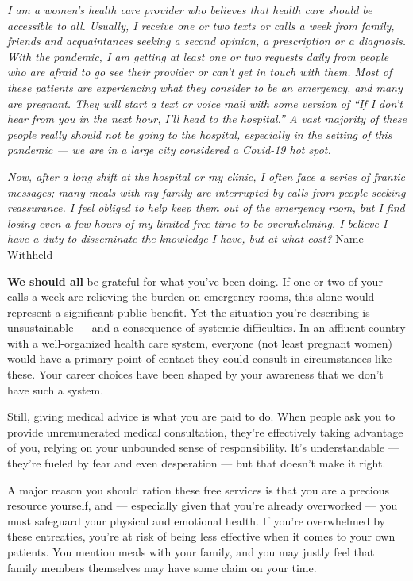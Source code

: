 \emph{I am a women's health care provider who believes that health care
should be accessible to all. Usually, I receive one or two texts or
calls a week from family, friends and acquaintances seeking a second
opinion, a prescription or a diagnosis. With the pandemic, I am getting
at least one or two requests daily from people who are afraid to go see
their provider or can't get in touch with them. Most of these patients
are experiencing what they consider to be an emergency, and many are
pregnant. They will start a text or voice mail with some version of ``If
I don't hear from you in the next hour, I'll head to the hospital.'' A
vast majority of these people really should not be going to the
hospital, especially in the setting of this pandemic --- we are in a
large city considered a Covid-19 hot spot.}

\emph{Now, after a long shift at the hospital or my clinic, I often face
a series of frantic messages; many meals with my family are interrupted
by calls from people seeking reassurance. I feel obliged to help keep
them out of the emergency room, but I find losing even a few hours of my
limited free time to be overwhelming. I believe I have a duty to
disseminate the knowledge I have, but at what cost?} Name Withheld

\textbf{We should all} be grateful for what you've been doing. If one or
two of your calls a week are relieving the burden on emergency rooms,
this alone would represent a significant public benefit. Yet the
situation you're describing is unsustainable --- and a consequence of
systemic difficulties. In an affluent country with a well-organized
health care system, everyone (not least pregnant women) would have a
primary point of contact they could consult in circumstances like these.
Your career choices have been shaped by your awareness that we don't
have such a system.

Still, giving medical advice is what you are paid to do. When people ask
you to provide unremunerated medical consultation, they're effectively
taking advantage of you, relying on your unbounded sense of
responsibility. It's understandable --- they're fueled by fear and even
desperation --- but that doesn't make it right.

A major reason you should ration these free services is that you are a
precious resource yourself, and --- especially given that you're already
overworked --- you must safeguard your physical and emotional health. If
you're overwhelmed by these entreaties, you're at risk of being less
effective when it comes to your own patients. You mention meals with
your family, and you may justly feel that family members themselves may
have some claim on your time.

